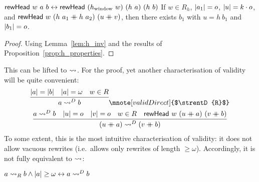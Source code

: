 \begin{lemma}\label{lem:rewHead_agree}\leavevmode
  \begin{enumerate}
     $\rewHead{w}{a}{b} \leftrightarrow \rewHead{(h_{\text{window}}~w)}{(h~a)}{(h~b)}$
     If $w \in R_h$, $\length{a_1} = o$, $\length{u} = k \cdot o$, and $\rewHead{w}{(h~a_1 \concat h~a_2)}{(u \concat v)}$, then there exists $b_1$ with $u = h~b_1$ and $\length{b_1} = o$.
  \end{enumerate}
\end{lemma}
\begin{proof}
  Using Lemma~\ref{lem:h_inv} and the results of Proposition~\ref{prop:h_properties}.
\end{proof}

This can be lifted to $\strent{}$. For the proof, yet another characterisation of validity will be quite convenient:
\begin{gather*}
  \infer{a \strentD{R} b}{\length{a} = \length{b} \quad \length{a} = \omega \quad w \in R}
  \mnote[validDirect]{$\strentD{R}$}\\
  \infer{(u \concat a) \strentD{R} (v \concat b)}{a \strentD{R} b \quad \length{u} = o \quad \length{v} = o \quad w \in R \quad \rewHead{w}{(u \concat a)}{(v \concat b)}}
\end{gather*}
To some extent, this is the most intuitive characterisation of validity: it does not allow vacuous rewrites (i.e.\ allows only rewrites of length $\ge \omega$). Accordingly, it is not fully equivalent to $\strent{}$:
\begin{lemma}
  $a \strent{R} b \land \length{a} \ge \omega \leftrightarrow a \strentD{R} b$
\end{lemma}

